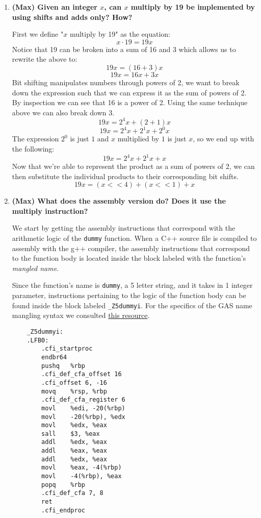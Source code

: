 \documentclass{article}
\begin{document}
\begin{enumerate}
    \item \textbf{(Max) Given an integer \( x \), can \( x \) multiply by 19 be implemented by using shifts and adds only? How?}
    
    First we define "\( x \) multiply by 19" as the equation:
    \[
    x \cdot 19 = 19x
    \]
    Notice that 19 can be broken into a sum of 16 and 3 which allows us to rewrite the above to:
    \[
    19x = (16+3)x 
    \]
    \[
    19x = 16x + 3x
    \]
    Bit shifting manipulates numbers through powers of 2, we want to break down the expression such that we
    can express it as the sum of powers of 2. By inspection we can see that 16 is a power of 2. Using the same
    technique above we can also break down 3.
    \[
    19x = 2^4x + (2+1)x
    \]
    \[
    19x = 2^4x + 2^1x + 2^0x
    \]
    The expression \(2^0\) is just \(1\) and \(x\) multiplied by \(1\) is just \(x\), so we end up with the following:
    \[
    19x = 2^4x + 2^1x + x
    \]
    Now that we're able to represent the product as a sum of powers of 2, we can then substitute the individual products
    to their corresponding bit shifts.
    \[
    19x = (x << 4) + (x << 1) + x
    \]

    \item \textbf{(Max) What does the assembly version do? Does it use the multiply instruction?}
    
    We start by getting the assembly instructions that correspond with the arithmetic logic of the \texttt{dummy} function.
    When a C++ source file is compiled to assembly with the g++ compiler, the assembly instructions that
    correspond to the function body is located inside the block labeled with the function's \emph{mangled name}.

    Since the function's name is \texttt{dummy}, a 5 letter string, and it takes in 1 integer parameter, instructions pertaining
    to the logic of the function body can be found inside the block labeled \texttt{\_Z5dummyi}. For the specifics of the
    GAS name mangling syntax we consulted \href{http://web.mit.edu/tibbetts/Public/inside-c/www/mangling.html}{this resource}.

    \begin{verbatim}
    _Z5dummyi:
    .LFB0:
        .cfi_startproc
        endbr64
        pushq	%rbp
        .cfi_def_cfa_offset 16
        .cfi_offset 6, -16
        movq	%rsp, %rbp
        .cfi_def_cfa_register 6
        movl	%edi, -20(%rbp)
        movl	-20(%rbp), %edx
        movl	%edx, %eax
        sall	$3, %eax
        addl	%edx, %eax
        addl	%eax, %eax
        addl	%edx, %eax
        movl	%eax, -4(%rbp)
        movl	-4(%rbp), %eax
        popq	%rbp
        .cfi_def_cfa 7, 8
        ret
        .cfi_endproc
    \end{verbatim}


\end{enumerate}
\end{document}
